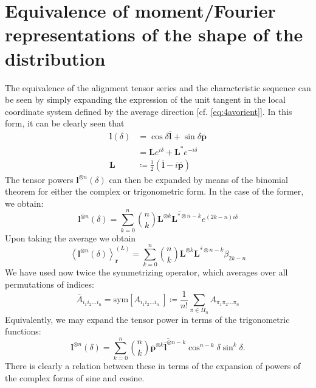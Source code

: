 \appendix

\section{Equivalence of moment/Fourier representations of the shape of the distribution}
The equivalence of the alignment tensor series and the characteristic sequence can be seen by simply expanding the expression of the unit tangent in the local coordinate system defined by the average direction {[}cf. \cref{eq:4avorient}{]}. In this form, it can be clearly seen that
\begin{subequations}
\begin{align}
    \boldsymbol{l}(\delta) &= \cos\delta\overline{\boldsymbol{l}} + \sin\delta\overline{\boldsymbol{p}}\\
    &=\boldsymbol{L}e^{i\delta} + \boldsymbol{L}^{*}e^{- i\delta}\\
    \boldsymbol{L} &\coloneqq \frac{1}{2}\left( \overline{\boldsymbol{l}} - i\overline{\boldsymbol{p}} \right)
\end{align}
\end{subequations}
The tensor powers \(\boldsymbol{l}^{\boldsymbol{\otimes}n}(\delta)\) can then be expanded by means of the binomial theorem for either the complex or trigonometric form. In the case of the former, we obtain:
\begin{equation}
\boldsymbol{l}^{\boldsymbol{\otimes}n}(\delta) = \sum_{k = 0}^{n}{{n\choose k}\overline{\boldsymbol{L}^{\boldsymbol{\otimes}k}\boldsymbol{L}^{\boldsymbol{* \otimes}n - k}}e^{(2k - n)i\delta}}
\end{equation}
Upon taking the average we obtain 
\begin{equation}
\left\langle \boldsymbol{l}^{\boldsymbol{\otimes}n}(\delta) \right\rangle_{\boldsymbol{r}}^{(L)} = \sum_{k = 0}^{n}{{n\choose k}\overline{\boldsymbol{L}^{\boldsymbol{\otimes}k}\boldsymbol{L}^{\boldsymbol{* \otimes}n - k}}\beta_{2k - n}}
\end{equation}
We have used now twice the symmetrizing operator, which averages over
all permutations of indices:
\begin{equation}
{\overline{A}}_{i_{1}i_{2}\ldots i_{n}} = \text{sym}\left\lbrack A_{i_{1}i_{2}\ldots i_{n}}\  \right\rbrack \coloneqq \frac{1}{n!}\sum_{\pi \in \Pi_{n}}^{}A_{\pi_{1}\pi_{2}\ldots\pi_{n}}\end{equation}
Equivalently, we may expand the tensor power in terms of the
trigonometric functions: 
\begin{equation}
\boldsymbol{l}^{\boldsymbol{\otimes}n}(\delta) = \sum_{k = 0}^{n}{{n\choose k}\overline{{\overline{\boldsymbol{p}}}^{\boldsymbol{\otimes}k}{\overline{\boldsymbol{l}}}^{\boldsymbol{\otimes}n - k}}\cos^{n - k}\delta\sin^{k}\delta}.
\end{equation}
There is clearly a relation between these in terms of the expansion of
powers of the complex forms of sine and cosine.

